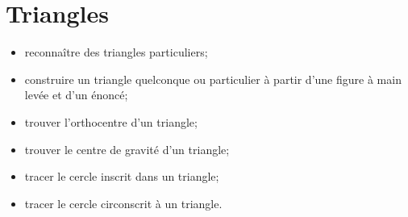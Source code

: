 \chapter{Triangles}\label{ChTriangles}

\begin{acquis}
\begin{itemize}
\item reconnaître des triangles particuliers;
\item construire un triangle quelconque ou particulier à partir d'une figure à main levée et d'un énoncé;
\item trouver l'orthocentre d'un triangle;
\item trouver le centre de gravité d'un triangle;
\item tracer le cercle inscrit dans un triangle;
\item tracer le cercle circonscrit à un triangle.
\end{itemize}
\end{acquis}

\activites


\cours


\exercicesbase
\begin{colonne*exercice}

\end{colonne*exercice}


\exercicesappr
\begin{colonne*exercice}

\end{colonne*exercice}

\connaissances


\TravauxPratiques %


\recreation



